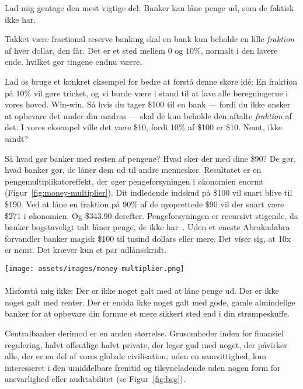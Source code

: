 Lad mig gentage den mest vigtige del: Banker kan låne penge ud, som de faktisk ikke har.

Takket være fractional reserve banking skal en bank kun beholde en lille
\textit{fraktion} af hver dollar, den får. Det er et sted mellem $0$ og $10\%$,
normalt i den lavere ende, hvilket gør tingene endnu værre.

Lad os bruge et konkret eksempel for bedre at forstå denne skøre idé: En
fraktion på $10\%$ vil gøre tricket, og vi burde være i stand til at lave alle
beregningerne i vores hoved. Win-win. Så hvis du tager \$100 til en
bank --- fordi du ikke ønsker at opbevare det under din madras --- skal de kun
beholde den aftalte \textit{fraktion} af det. I vores eksempel ville det
være \$10, fordi 10\% af \$100 er \$10. Nemt, ikke sandt?

Så hvad gør banker med resten af pengene? Hvad sker der med dine \$90? De
gør, hvad banker gør, de låner dem ud til andre mennesker. Resultatet er en pengemultiplikatoreffekt,
der øger pengeforsyningen i økonomien enormt
(Figur~\ref{fig:money-multiplier}). Dit indledende indskud på \$100 vil snart
blive til \$190. Ved at låne en fraktion på 90\% af de nyoprettede \$90 vil der
snart være \$271 i økonomien. Og \$343.90 derefter. Pengeforsyningen er
recursivt stigende, da banker bogstaveligt talt låner penge, de ikke
har~\cite{wiki:money-multiplier}. Uden et eneste Abrakadabra forvandler
banker magisk \$100 til tusind dollars eller mere. Det viser sig, at 10x er nemt.
Det kræver kun et par udlånsskridt.

\begin{center}
  \centering
  \texttt{[image: assets/images/money-multiplier.png]}
  \label{fig:money-multiplier}
\end{center}
  
\paragraph{}
Misforstå mig ikke: Der er ikke noget galt med at låne penge ud. Der er
ikke noget galt med renter. Der er endda ikke noget galt med gode,
gamle almindelige banker for at opbevare din formue et mere sikkert sted end i
din strømpeskuffe.

Centralbanker derimod er en anden størrelse. Grusomheder inden for finansiel
regulering, halvt offentlige halvt private, der leger gud med noget, der
påvirker alle, der er en del af vores globale civilisation, uden en
samvittighed, kun interesseret i den umiddelbare fremtid og tilsyneladende
uden nogen form for ansvarlighed eller auditabilitet (se Figur~\ref{fig:bsg}).

